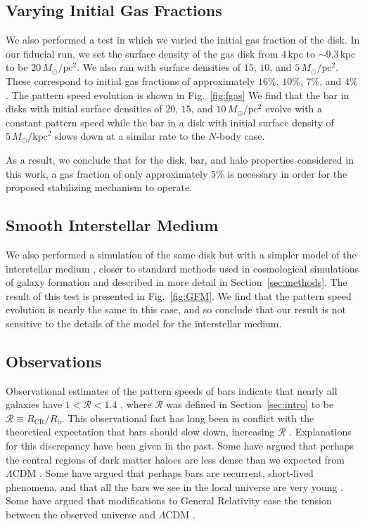 \documentclass[fleqn,usenatbib]{mnras}
\newcommand{\RCR}{\ensuremath{R_{\textrm{CR}}}}
\newcommand{\Rot}{\ensuremath{\mathcal{R}}}
\newcommand{\Rb}{\ensuremath{R_{\textrm{b}}}}
\newcommand{\Nbody}{$N$-body}
\newcommand{\Msun}{\ensuremath{M_{\odot}}}
\begin{document}
\subsection{Varying Initial Gas Fractions}
We also performed a test in which we varied the initial gas fraction of the
disk. In our fiducial run, we set the surface density of the gas disk from
$4\,\textrm{kpc}$ to $\sim9.3\,\textrm{kpc}$ to be $20\,\Msun/\textrm{pc}^2$.
We also ran with surface densities of $15$, $10$, and
$5\,\Msun/\textrm{pc}^2$. These correspond to initial gas fractions of
approximately $16\%$, $10\%$, $7\%$, and $4\%$. The pattern speed evolution is
shown in Fig.~\ref{fig:fgas} We find that the bar in disks with
initial surface densities of $20$, $15$, and $10\,\Msun/\textrm{pc}^2$ evolve
with a constant pattern speed while the bar in a disk with initial surface
density of $5\,\Msun/\textrm{kpc}^2$ slows down at a similar rate to the \Nbody{} case.

As a result, we conclude that for the disk, bar, and halo properties
considered in this work, a gas fraction of only approximately $5\%$ is
necessary in order for the proposed stabilizing mechanism to operate.



\subsection{Smooth Interstellar Medium}
We also performed a simulation of the same disk but with a simpler model of the
interstellar medium \citep{2003MNRAS.339..289S}, closer to standard methods used
in cosmological simulations of galaxy formation and described in more detail in
Section~\ref{sec:methods}. The result of this test is presented in
Fig.~\ref{fig:GFM}. We find that the pattern speed evolution is nearly the same
in this case, and so conclude that our result is not sensitive to the details of
the model for the interstellar medium.


\subsection{Observations}
Observational estimates of the pattern speeds of bars indicate that nearly all
galaxies have $1 < \Rot < 1.4$ \citep{2011MSAIS..18...23C, 2015AA...576A.102A,
2019MNRAS.482.1733G, 2020MNRAS.491.3655G}, where $\Rot$ was defined in
Section~\ref{sec:intro} to be $\Rot\equiv \RCR/\Rb$. This observational fact has
long been in conflict with the theoretical expectation that bars should slow
down, increasing \Rot{} \citep[e.g.][]{1984MNRAS.209..729T, 1985MNRAS.213..451W,
2000ApJ...543..704D}. Explanations for this discrepancy have been given in the
past. Some have argued that perhaps the central regions of dark matter haloes
are less dense than we expected from $\Lambda\textrm{CDM}$
\citep[e.g.][]{2000ApJ...543..704D,2021AA...650L..16F}. Some have argued that
perhaps bars are recurrent, short-lived phenomena, and that all the bars we see
in the local universe are very young \citep{2002AA...392...83B,
2005MNRAS.364L..18B}. Some have argued that modifications to General Relativity
ease the tension between the observed universe and $\Lambda\textrm{CDM}$
\citep[e.g.][]{2021MNRAS.503.2833R, 2021MNRAS.508..926R}.
\end{document}
